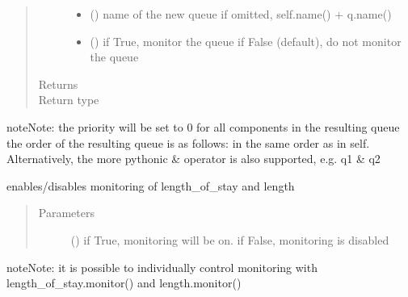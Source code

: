 \documentclass[letterpaper,10pt,english]{sphinxmanual}
\begin{document}
\begin{fulllineitems}
\begin{fulllineitems}
\begin{quote}
\begin{description}
\begin{itemize}
\item {} 
 () \textendash{} name of the  new queue 
if omitted, self.name() + q.name()

\item {} 
 () \textendash{} if True, monitor the queue 
if False (default), do not monitor the queue

\end{itemize}

\item[{Returns}] \leavevmode
{}

\item[{Return type}] \leavevmode
{\hyperref[\detokenize{Reference:salabim.Queue}]{}}

\end{description}\end{quote}

\begin{sphinxadmonition}{note}{Note:}
the priority will be set to 0 for all components in the
resulting  queue 
the order of the resulting queue is as follows: 
in the same order as in self. 
Alternatively, the more pythonic \& operator is also supported, e.g. q1 \& q2
\end{sphinxadmonition}

\end{fulllineitems}


\begin{fulllineitems}
\label{\detokenize{Reference:salabim.Queue.monitor}}
enables/disables monitoring of length\_of\_stay and length
\begin{quote}\begin{description}
\item[{Parameters}] \leavevmode
{} () \textendash{} if True, monitoring will be on. 
if False, monitoring is disabled 

\end{description}\end{quote}

\begin{sphinxadmonition}{note}{Note:}
it is possible to individually control monitoring with length\_of\_stay.monitor() and length.monitor()
\end{sphinxadmonition}


\end{fulllineitems}
\end{fulllineitems}
\end{document}
